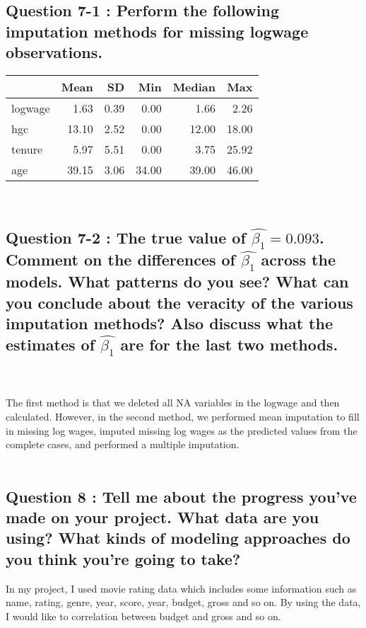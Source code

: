 \documentclass[12pt, letterpaper]{article}
\begin{document}
\subsection*{Question 7-1 : Perform the following imputation methods for missing logwage observations.}
\begin{table}[h]
\centering
\begin{tabular}[t]{lrrrrr}
\toprule
  & Mean & SD & Min & Median & Max\\
\midrule
logwage & \num{1.63} & \num{0.39} & \num{0.00} & \num{1.66} & \num{2.26}\\
hgc & \num{13.10} & \num{2.52} & \num{0.00} & \num{12.00} & \num{18.00}\\
tenure & \num{5.97} & \num{5.51} & \num{0.00} & \num{3.75} & \num{25.92}\\
age & \num{39.15} & \num{3.06} & \num{34.00} & \num{39.00} & \num{46.00}\\
\bottomrule
\end{tabular}
\end{table}
\\
\subsection*{Question 7-2 : The true value of $\hat{\beta_{1}}=0.093$. Comment on the differences of $\hat{\beta_{1}}$ across the models. What patterns do you see? What can you conclude about the veracity of the various imputation methods? Also discuss what the estimates of $\hat{\beta_{1}}$ are for the last two methods.}
\\
\\
The first method is that we deleted all NA variables in the logwage and then calculated. However, in the second method, we performed mean imputation to fill in missing log wages, imputed missing log wages as the predicted values from the complete cases, and performed a multiple imputation. 
\\
\\
\subsection*{Question 8 : Tell me about the progress you've made on your project. What data are you using? What kinds of modeling approaches do you think you're going to take?}
In my project, I used movie rating data which includes some information such as name, rating, genre, year, score, year, budget, gross and so on. By using the data, I would like to correlation between budget and gross and so on. 
\end{document}
